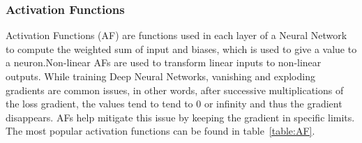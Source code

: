 \subsubsection{Activation Functions}

\quad Activation Functions (AF) are functions used in each layer of a Neural Network to compute the weighted sum of input and biases,
which is used to give a value to a neuron.Non-linear AFs are used to transform linear inputs to non-linear outputs.
 While training Deep Neural Networks, vanishing and exploding gradients
are common issues, in other words, after successive multiplications of the loss gradient, the values tend to tend to 0 or infinity and thus the gradient disappears.
AFs help mitigate this issue by keeping the gradient in specific limits. The most popular activation functions can be found in table~\ref{table:AF}.



\begin{table}[]
    \centering
    \resizebox{.6\textwidth}{!}{%
    \begin{tabular}{ll}
    \hline
    \textbf{Activation Functions} & \textbf{Computation Equation} \\ \hline \hline
    Sigmoid                       &  $\displaystyle f(x)=\frac{1}{1+ e^{-x}}$                             \\ \hline
    Tanh                          &  $\displaystyle f(x)=\frac{e^{x}-e^{-x}}{e^{x}+e^{-x}}$                            \\ \hline
    Softmax                       &  $\displaystyle f(x_{i})=\frac{x_{i}}{\sum_{j}e^{x_{j}}}$                             \\ \hline
    ReLU                          &    $ f(x)=\begin{matrix}
        x & if & x\geq 0  \\ 
        0 & if & x< 0 
    \end{matrix} $                           \\ \hline
    LReLU                         &  $f(x)= \begin{matrix}
        x & if & x > 0  \\ 
        \alpha x & if & x \leq 0 
    \end{matrix} $                        \\ \hline
    ELU                           &             $ f(x)=\begin{matrix}
        x & if & x> 0  \\ 
        \alpha e^{x} - 1 & if & x\leq 0 
    \end{matrix} $                 \\ \hline
    \end{tabular}%
    }
    \caption{Popular Activation functions}
    \label{table:AF}
\end{table}


